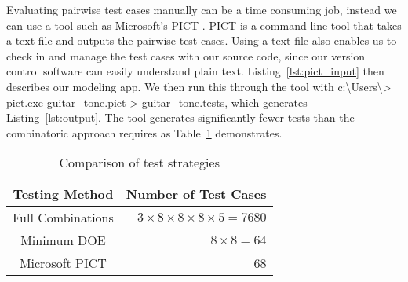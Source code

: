 \documentclass[12pt,journal]{article}
\begin{document}
Evaluating pairwise test cases manually can be a time consuming job, instead
we can use a tool such as Microsoft's PICT \autocite{czerwonka_pairwise_2008}.
PICT is a command-line tool that takes a text file and outputs the pairwise
test cases. Using a text file also enables us to check in and manage the test
 cases with our source code, since our version control software can easily
 understand plain text. Listing~\ref{lst:pict_input} then describes our
 modeling app.  We then run this through the tool with
 {\ttfamily c:\textbackslash Users\textbackslash > pict.exe guitar\_tone.pict
 > guitar\_tone.tests}, which generates Listing~\ref{lst:output}. The tool
 generates significantly fewer tests than the combinatoric approach requires as 
 Table~\ref{tab:comparison} demonstrates.  

\begin{table}
    \centering
    \caption{Comparison of test strategies}
    \label{tab:comparison}
    \begin{tabular}{c | r }
        \hline
Testing Method & Number of Test Cases  \\
        \hline \hline 
        Full Combinations & $3 \times 8 \times 8 \times  8 \times 5 = 7680$\\
        Minimum DOE & $8 \times 8 = 64$\\
        Microsoft PICT & 68\\
        \hline
    \end{tabular}
\end{table}
\end{document}
